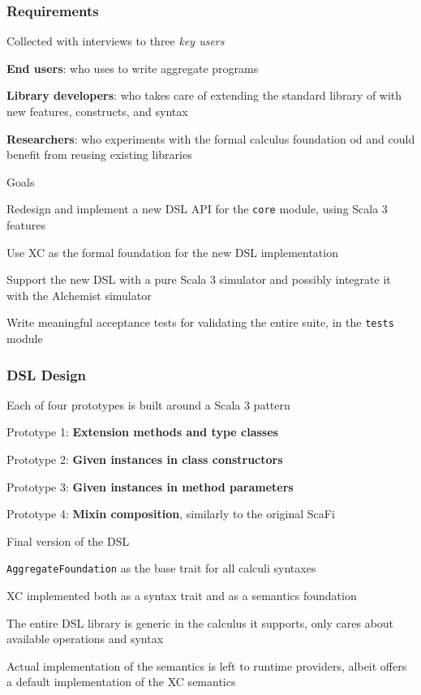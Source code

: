\begin{frame}
    \frametitle{Requirements}
    \begin{blockitems}{Collected with interviews to three \textit{key users}}
        \item \textbf{End users}: who uses \this to write aggregate programs
        \item \textbf{Library developers}: who takes care of extending the standard library of \this with new features, constructs, and syntax
        \item \textbf{Researchers}: who experiments with the formal calculus foundation od \this and could benefit from reusing existing libraries
    \end{blockitems}
    \begin{blockitems}{Goals}
        \item Redesign and implement a new \ac{DSL} \ac{API} for the \texttt{core} module, using Scala 3 features
        \item Use \ac{XC} as the formal foundation for the new \ac{DSL} implementation
        \item Support the new \ac{DSL} with a pure Scala 3 simulator and possibly integrate it with the Alchemist simulator
        \item Write meaningful acceptance tests for validating the entire suite, in the \texttt{tests} module
    \end{blockitems}
\end{frame}

\begin{frame}
    \frametitle{\ac{DSL} Design}
    \begin{blockitems}{Each of four prototypes is built around a Scala 3 pattern}
        \item Prototype 1: \textbf{Extension methods and type classes}
        \item Prototype 2: \textbf{Given instances in class constructors}
        \item Prototype 3: \textbf{Given instances in method parameters}
        \item Prototype 4: \textbf{Mixin composition}, similarly to the original ScaFi
    \end{blockitems}
    \begin{blockitems}{Final version of the \ac{DSL}}
        \item \texttt{AggregateFoundation} as the base trait for all calculi syntaxes
        \item \ac{XC} implemented both as a syntax trait and as a semantics foundation
        \item The entire \ac{DSL} library is generic in the calculus it supports, only cares about available operations and syntax
        \item Actual implementation of the semantics is left to runtime providers, albeit \this offers a default implementation of the \ac{XC} semantics
    \end{blockitems}
\end{frame}

